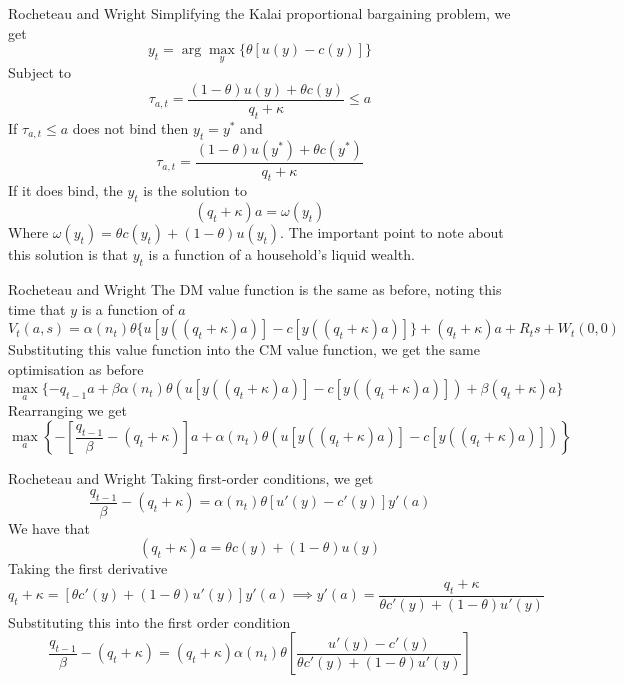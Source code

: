 \documentclass[aspectratio=169,xcolor=dvipsnames]{beamer}
\begin{document}
\begin{frame}{Rocheteau and Wright}
    Simplifying the Kalai proportional bargaining problem, we get
    \[
        y_t = \arg \max_y \{\theta [u(y) - c(y)]\}
    \]
    Subject to
    \[
        \tau_{a,t} = \frac{(1-\theta) u(y) + \theta c(y)}{q_t + \kappa} \le a
    \]
    If $\tau_{a,t} \le a$ does not bind then $y_t = y^*$ and
    \[
        \tau_{a,t} = \frac{(1-\theta) u(y^*) + \theta c(y^*)}{q_t + \kappa}
    \]
    If it does bind, the $y_t$ is the solution to
    \[
        (q_t + \kappa) a = \omega(y_t)
    \]
    Where $\omega(y_t) = \theta c(y_t) + (1-\theta) u(y_t)$. The important point to note about this solution is that $y_t$ is a function of a household's liquid wealth.
\end{frame}

\begin{frame}{Rocheteau and Wright}
    The DM value function is the same as before, noting this time that $y$ is a function of $a$
    \[
        V_t(a, s) = \alpha(n_t) \theta \{u[y((q_t + \kappa) a)] - c[y((q_t + \kappa) a)]\} + (q_t + \kappa) a + R_t s + W_t(0,0)
    \]
    Substituting this value function into the CM value function, we get the same optimisation as before
    \[
        \max_a \{-q_{t-1} a + \beta \alpha(n_t) \theta (u[y((q_t + \kappa) a)] - c[y((q_t + \kappa) a)]) + \beta(q_t + \kappa) a\}
    \]
    Rearranging we get
    \[
        \max_a\left\{ -\left[\frac{q_{t-1}}{\beta} - (q_t + \kappa)\right] a + \alpha(n_t) \theta (u[y((q_t + \kappa) a)] - c[y((q_t + \kappa) a)])\right\}
    \]
\end{frame}

\begin{frame}{Rocheteau and Wright}
    Taking first-order conditions, we get
    \[
        \frac{q_{t-1}}{\beta} - (q_t + \kappa) = \alpha(n_t) \theta [u'(y) - c'(y)] y'(a)
    \]
    We have that
    \[
        (q_t + \kappa) a = \theta c(y) + (1 - \theta) u(y)
    \]
    Taking the first derivative
    \[
        q_t + \kappa = [\theta c'(y) + (1-\theta) u'(y)] y'(a) \implies y'(a) = \frac{q_t + \kappa}{\theta c'(y) + (1-\theta) u'(y)}
    \]
    Substituting this into the first order condition
    \[
        \frac{q_{t-1}}{\beta} - (q_t + \kappa) = (q_t + \kappa) \alpha(n_t) \theta \left[ \frac{u'(y) - c'(y)}{\theta c'(y) + (1-\theta) u'(y)}\right]
    \]
\end{frame}
\end{document}
